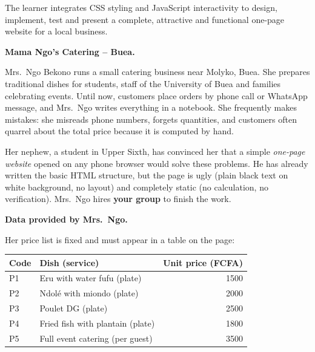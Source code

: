 \documentclass[11pt]{article}
\newcounter{popsec}
\newcounter{popsub}
\newcommand{\courssub}[1]{%
  \stepcounter{popsub}%
  \par\vspace{9pt}\noindent{\popxbold\fontsize{11.5}{13}\selectfont\color{popink}{\color{poporange}\thepopsec.\thepopsub}\hspace{6pt}#1}\par\nopagebreak\vspace{4pt}
}
\begin{document}
\begin{aretenir}
The learner integrates CSS styling and JavaScript interactivity to design, implement, test and present a complete, attractive and functional one-page website for a local business.
\end{aretenir}

\courssub{Situation}

\textbf{Mama Ngo's Catering -- Buea.}\par
Mrs.\ Ngo Bekono runs a small catering business near Molyko, Buea. She prepares traditional dishes for students, staff of the University of Buea and families celebrating events. Until now, customers place orders by phone call or WhatsApp message, and Mrs.\ Ngo writes everything in a notebook. She frequently makes mistakes: she misreads phone numbers, forgets quantities, and customers often quarrel about the total price because it is computed by hand.

Her nephew, a student in Upper Sixth, has convinced her that a simple \emph{one-page website} opened on any phone browser would solve these problems. He has already written the basic HTML structure, but the page is ugly (plain black text on white background, no layout) and completely static (no calculation, no verification). Mrs.\ Ngo hires \textbf{your group} to finish the work.

\textbf{Data provided by Mrs.\ Ngo.}\par
Her price list is fixed and must appear in a table on the page:

\begin{center}
\begin{tabularx}{\linewidth}{|l|X|r|}
\hline
\rowcolor{popblueL} \textbf{Code} & \textbf{Dish (service)} & \textbf{Unit price (FCFA)} \\
\hline
P1 & Eru with water fufu (plate) & 1500 \\
\hline
P2 & Ndol\'e with miondo (plate) & 2000 \\
\hline
P3 & Poulet DG (plate) & 2500 \\
\hline
P4 & Fried fish with plantain (plate) & 1800 \\
\hline
P5 & Full event catering (per guest) & 3500 \\
\hline
\end{tabularx}
\end{center}
\end{document}
